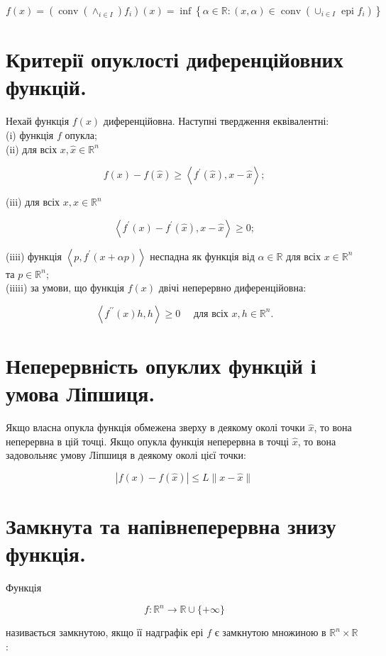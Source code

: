 \documentclass[10pt]{article}
\begin{document}
$$
f(x)=\left(\operatorname{conv}\left(\wedge_{i \in I}\right) f_{i}\right)(x)=\inf \left\{\alpha \in \mathbb{R}:(x, \alpha) \in \operatorname{conv}\left(\cup_{i \in I} \text { epi } f_{i}\right)\right\}
$$

\section*{Критерії опуклості диференційовних функцій.}
Нехай функція $f(x)$ диференційовна. Наступні твердження еквівалентні:\\
(i) функція $f$ опукла;\\
(ii) для всіх $x, \hat{x} \in \mathbb{R}^{n}$

$$
f(x)-f(\hat{x}) \geq\left\langle f^{\prime}(\hat{x}), x-\hat{x}\right\rangle ;
$$

(iii) для всіх $x, \hat{x} \in \mathbb{R}^{n}$

$$
\left\langle f^{\prime}(x)-f^{\prime}(\hat{x}), x-\hat{x}\right\rangle \geq 0 ;
$$

(iiii) функція $\left\langle p, f^{\prime}(x+\alpha p)\right\rangle$ неспадна як функція від $\alpha \in \mathbb{R}$ для всіх $x \in \mathbb{R}^{n}$ та $p \in \mathbb{R}^{n}$;\\
(iiiii) за умови, що функція $f(x)$ двічі неперервно диференційовна:

$$
\left\langle f^{\prime \prime}(x) h, h\right\rangle \geq 0 \quad \text { для всіх } x, h \in \mathbb{R}^{n} .
$$

\section*{Неперервність опуклих функцій і умова Ліпшиця.}
Якщо власна опукла функція обмежена зверху в деякому околі точки $\widehat{x}$, то вона неперервна в цій точці. Якщо опукла функція неперервна в точці $\widehat{x}$, то вона задовольняє умову Ліпшиця в деякому околі цієї точки:

$$
|f(x)-f(\widehat{x})| \leq L\|x-\widehat{x}\|
$$

\section*{Замкнута та напівнеперервна знизу функція.}
Функція

$$
f: \mathbb{R}^{n} \rightarrow \mathbb{R} \cup\{+\infty\}
$$

називається замкнутою, якщо її надграфік ері $f$ є замкнутою множиною в $\mathbb{R}^{n} \times \mathbb{R}$ :
\end{document}
